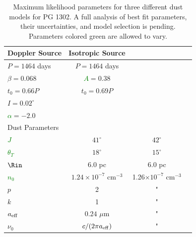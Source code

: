 \begin{table}
\begin{center}
\begin{tabular}{ l |     c | c  |c }
Doppler Source        				& Isotropic Source  				&  \\
                  \hline				
$P =  1464$ days  				 & $P =  1464$ days  			 & \\
$\beta = 0.068$		   			 & \textcolor{green}{$A $}$= 0.38$	& \\
$t_0 = 0.66P$  					&  $t_0 = 0.69P$		   	         & \\ 
$I = 0.02^{\circ}$  				& 		   	       				&\\ 
\textcolor{green}{$\alpha$}$ = -2.0$  & 	   	   					 &\\
                   \hline 	
                  Dust Parameters &   &\\
                  \hline	
\textcolor{green}{$J$}              	& $41^{\circ}$					  & $42^{\circ}$				  	\\
\textcolor{green}{$\theta_T$}   	& $18^{\circ}$					  & $15^{\circ}$							  	\\
\textcolor{green}{$\Rin$}            & $6.0$ pc            				  & $6.0$ pc					  		   \\
\textcolor{green}{$n_0$}            &  $1.24 \times 10^{-7}$ cm$^{-3}$	  & 1.26$ \times 10^{-7}$ cm$^{-3}$   	\\
$p$   			           	& 2						        	  & "							  	\\
$k$		    			  	&  1 							  &"		   	    				    \\
$a_{\rm{eff}}$		         	& $0.24$ $\mu$m				  &"	\\
$\nu_0$					&  $c/(2 \pi a_{\rm{eff}})$			  &"		   	    				    \\
\hline

 \end{tabular}
\caption{Maximum likelihood parameters for three different dust models for PG 1302. A full analysis of best fit parameters, their uncertainties, and model selection is pending. Parameters colored green are allowed to vary.}
\label{Table:Fit}
\end{center}
\end{table}








